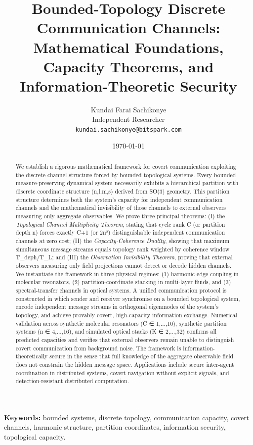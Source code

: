 \documentclass[11pt,twocolumn,a4paper]{article}
\title{\textbf{Bounded-Topology Discrete Communication Channels:\\[3pt]
Mathematical Foundations, Capacity Theorems, and\\
Information-Theoretic Security}}
\author{
Kundai Farai Sachikonye\\
Independent Researcher\\
\texttt{kundai.sachikonye@bitspark.com}
}
\date{\today}
\theoremstyle{definition}
\begin{document}
\maketitle

\begin{abstract}
We establish a rigorous mathematical framework for covert communication exploiting the discrete channel structure forced by bounded topological systems. Every bounded measure-preserving dynamical system necessarily exhibits a hierarchical partition with discrete coordinate structure (n,l,m,s) derived from SO(3) geometry. This partition structure determines both the system's capacity for independent communication channels and the mathematical invisibility of those channels to external observers measuring only aggregate observables. We prove three principal theorems: (I) the \emph{Topological Channel Multiplicity Theorem}, stating that cycle rank C (or partition depth n) forces exactly C+1 (or 2n²) distinguishable independent communication channels at zero cost; (II) the \emph{Capacity-Coherence Duality}, showing that maximum simultaneous message streams equals topology rank weighted by coherence window T_deph/T_L; and (III) the \emph{Observation Invisibility Theorem}, proving that external observers measuring only field projections cannot detect or decode hidden channels. We instantiate the framework in three physical regimes: (1) harmonic-edge coupling in molecular resonators, (2) partition-coordinate stacking in multi-layer fluids, and (3) spectral-transfer channels in optical systems. A unified communication protocol is constructed in which sender and receiver synchronise on a bounded topological system, encode independent message streams in orthogonal eigenmodes of the system's topology, and achieve provably covert, high-capacity information exchange. Numerical validation across synthetic molecular resonators (C ∈ {1,...,10}), synthetic partition systems (n ∈ {4,...,16}), and simulated optical stacks (K ∈ {2,...,32}) confirms all predicted capacities and verifies that external observers remain unable to distinguish covert communication from background noise. The framework is information-theoretically secure in the sense that full knowledge of the aggregate observable field does not constrain the hidden message space. Applications include secure inter-agent coordination in distributed systems, covert navigation without explicit signals, and detection-resistant distributed computation.
\end{abstract}

\noindent\textbf{Keywords:} bounded systems, discrete topology, communication capacity, covert channels, harmonic structure, partition coordinates, information security, topological capacity.
\end{document}
